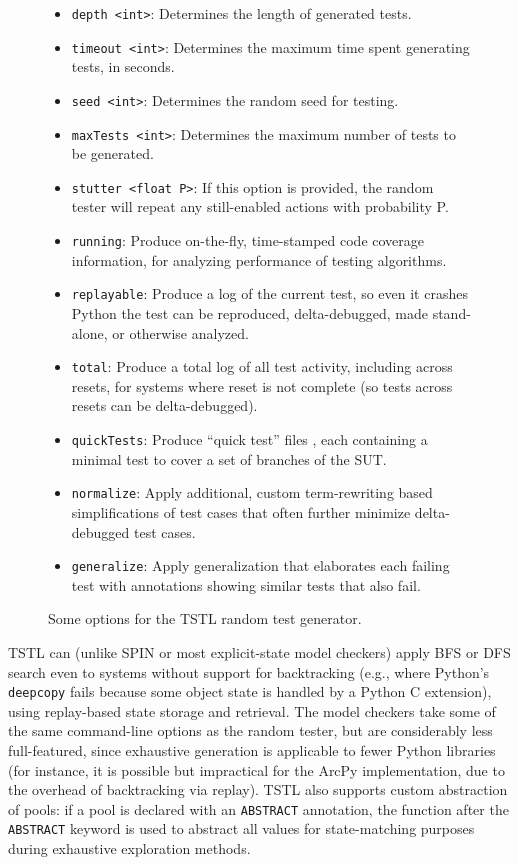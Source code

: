 \begin{figure}
{\scriptsize
\begin{itemize}
\item {\tt depth <int>}: Determines the length of generated tests.
\item {\tt timeout <int>}: Determines the maximum time spent generating tests, in seconds.
\item {\tt seed <int>}: Determines the random seed for testing.
\item {\tt maxTests <int>}: Determines the maximum number of tests to be generated.
\item {\tt stutter <float P>}: If this option is provided, the random tester will repeat any still-enabled actions with probability P.
\item {\tt running}: Produce on-the-fly, time-stamped code coverage information, for analyzing performance of testing algorithms. 
\item {\tt replayable}: Produce a log of the current test, so even it crashes Python the test can be reproduced, delta-debugged, made stand-alone, or otherwise analyzed.
\item {\tt total}: Produce a total log of all test activity, including across resets, for systems where reset is not complete (so tests across resets can be delta-debugged).
\item {\tt quickTests}:  Produce ``quick test'' files \cite{icst14}, each containing a minimal test to cover a set of branches of the SUT. 
\item {\tt normalize}: Apply additional, custom term-rewriting based simplifications of test cases that often further minimize delta-debugged test cases. 
\item {\tt generalize}: Apply generalization that elaborates each failing test with annotations showing similar tests that also fail. 
\end{itemize}
}
\caption{Some options for the TSTL random test generator.}
\label{tab:rt}
\end{figure}

TSTL can (unlike SPIN or most explicit-state model checkers) apply BFS or DFS search even to systems without support for backtracking (e.g., where Python's {\tt deepcopy} fails because some object state is handled by a Python C extension), using replay-based state storage and retrieval.  The model checkers take some of the same command-line options as the random tester, but are considerably less full-featured, since exhaustive generation is applicable to fewer Python libraries (for instance, it is possible but impractical for the ArcPy implementation, due to the overhead of backtracking via replay).  TSTL also supports custom abstraction of pools:  if a pool is declared with an {\tt ABSTRACT} annotation, the function after the {\tt ABSTRACT} keyword is used to abstract all values for state-matching purposes during exhaustive exploration methods.  

